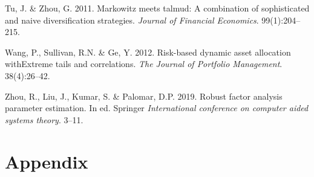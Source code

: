\documentclass[11pt,preprint, authoryear]{elsarticle}
\numberwithin{equation}{section}
\numberwithin{figure}{section}
\numberwithin{table}{section}
\begin{document}
\leavevmode\hypertarget{ref-tu2011}{}%
Tu, J. \& Zhou, G. 2011. Markowitz meets talmud: A combination of
sophisticated and naive diversification strategies. \emph{Journal of
Financial Economics}. 99(1):204--215.

\leavevmode\hypertarget{ref-wang2012}{}%
Wang, P., Sullivan, R.N. \& Ge, Y. 2012. Risk-based dynamic asset
allocation withExtreme tails and correlations. \emph{The Journal of
Portfolio Management}. 38(4):26--42.

\leavevmode\hypertarget{ref-zhou2019}{}%
Zhou, R., Liu, J., Kumar, S. \& Palomar, D.P. 2019. Robust factor
analysis parameter estimation. In ed. Springer \emph{International
conference on computer aided systems theory}. 3--11.

\newpage

\hypertarget{appendix}{%
\section*{Appendix}\label{appendix}}
\end{document}
